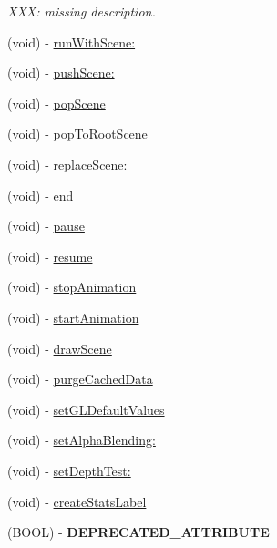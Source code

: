 \begin{DoxyCompactItemize}
\begin{DoxyCompactList}\small\item\em X\-X\-X\-: missing description. \end{DoxyCompactList}\item 
(void) -\/ \hyperlink{class_c_c_director_a0d911c4e53f8911b865ea30a7d9c9edf}{run\-With\-Scene\-:}
\item 
(void) -\/ \hyperlink{class_c_c_director_a548727f4d1521265d32abc2916f72f55}{push\-Scene\-:}
\item 
(void) -\/ \hyperlink{class_c_c_director_a7b589b1d6aa206be0461b89b6641cc9e}{pop\-Scene}
\item 
(void) -\/ \hyperlink{class_c_c_director_a26d810c8ffe6661de10ea0053a05e061}{pop\-To\-Root\-Scene}
\item 
(void) -\/ \hyperlink{class_c_c_director_a3c4f5bda7d6116fc43c9bc4a557aaca4}{replace\-Scene\-:}
\item 
(void) -\/ \hyperlink{class_c_c_director_ab9239db827bd235926d332ac6b703a5f}{end}
\item 
(void) -\/ \hyperlink{class_c_c_director_a5b2530cdd2974d9184c724aea427e623}{pause}
\item 
(void) -\/ \hyperlink{class_c_c_director_a18439e4df21b10a86af2e6672c17c274}{resume}
\item 
(void) -\/ \hyperlink{class_c_c_director_a2c91c30bc5f469af8026bb652d8d81fd}{stop\-Animation}
\item 
(void) -\/ \hyperlink{class_c_c_director_a67c2726c80fc4e3775f258b19355fb63}{start\-Animation}
\item 
(void) -\/ \hyperlink{class_c_c_director_a26982c21e0a77ca5fd9de3e5ab72f075}{draw\-Scene}
\item 
(void) -\/ \hyperlink{class_c_c_director_a9ff26f3138b26cc651aaa3a5a4f43bde}{purge\-Cached\-Data}
\item 
(void) -\/ \hyperlink{class_c_c_director_a85f76d0c6ce9547de061a2de53ab15dc}{set\-G\-L\-Default\-Values}
\item 
(void) -\/ \hyperlink{class_c_c_director_a7908ede74061a61c39db5b201263507c}{set\-Alpha\-Blending\-:}
\item 
(void) -\/ \hyperlink{class_c_c_director_aa03af894e6e5e43fe49424fdf213fca2}{set\-Depth\-Test\-:}
\item 
(void) -\/ \hyperlink{class_c_c_director_a783898f91b7e63bb8ed54e770c7da676}{create\-Stats\-Label}
\item 
\hypertarget{class_c_c_director_a661703bb033b456fd8e936dbd869bb01}{(B\-O\-O\-L) -\/ {\bfseries D\-E\-P\-R\-E\-C\-A\-T\-E\-D\-\_\-\-A\-T\-T\-R\-I\-B\-U\-T\-E}}\label{class_c_c_director_a661703bb033b456fd8e936dbd869bb01}


\end{DoxyCompactItemize}

